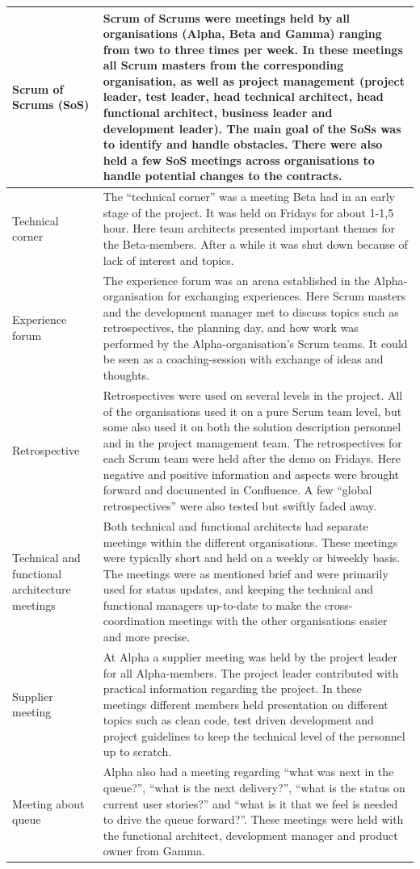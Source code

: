 \begin{center}
\begin{longtable}{| p{3.5cm} | p{8cm} |}
    Scrum of Scrums (SoS) & Scrum of Scrums were meetings held by all organisations (Alpha, Beta and Gamma) ranging from two to three times per week. In these meetings all Scrum masters from the corresponding organisation, as well as project management (project leader, test leader, head technical architect, head functional architect, business leader and development leader). The main goal of the SoSs was to identify and handle obstacles. There were also held a few SoS meetings across organisations to handle potential changes to the contracts. \\ \hline
    Technical corner & The ``technical corner'' was a meeting Beta had in an early stage of the project. It was held on Fridays for about 1-1,5 hour. Here team architects presented important themes for the Beta-members. After a while it was shut down because of lack of interest and topics. \\ \hline
    Experience forum & The experience forum was an arena established in the Alpha-organisation for exchanging experiences. Here Scrum masters and the development manager met to discuss topics such as retrospectives, the planning day, and how work was performed by the Alpha-organisation's Scrum teams. It could be seen as a coaching-session with exchange of ideas and thoughts. \\ \hline
    Retrospective & Retrospectives were used on several levels in the project. All of the organisations used it on a pure Scrum team level, but some also used it on both the solution description personnel and in the project management team. The retrospectives for each Scrum team were held after the demo on Fridays. Here negative and positive information and aspects were brought forward and documented in Confluence. A few ``global retrospectives'' were also tested but swiftly faded away. \\ \hline
    Technical and functional architecture meetings & Both technical and functional architects had separate meetings within the different organisations. These meetings were typically short and held on a weekly or biweekly basis. The meetings were as mentioned brief and were primarily used for status updates, and keeping the technical and functional managers up-to-date to make the cross-coordination meetings with the other organisations easier and more precise. \\ \hline
    Supplier meeting & At Alpha a supplier meeting was held by the project leader for all Alpha-members. The project leader contributed with practical information regarding the project. In these meetings different members held presentation on different topics such as clean code, test driven development and project guidelines to keep the technical level of the personnel up to scratch. \\ \hline
    Meeting about queue & Alpha also had a meeting regarding ``what was next in the queue?'', ``what is the next delivery?'', ``what is the status on current user stories?'' and ``what is it that we feel is needed to drive the queue forward?''. These meetings were held with the functional architect, development manager and product owner from Gamma. \\ \hline


\end{longtable}
\end{center}
